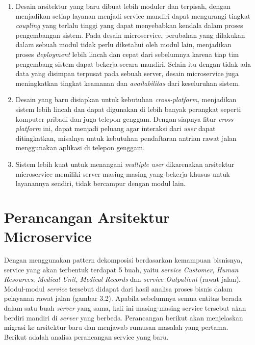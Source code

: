 \begin{enumerate}[leftmargin=*]
	\item Desain arsitektur yang baru dibuat lebih moduler dan terpisah, dengan menjadikan setiap layanan menjadi service mandiri dapat mengurangi tingkat \textit{coupling} yang terlalu tinggi yang dapat menyebabkan kendala dalam proses pengembangan sistem. Pada desain microservice, perubahan yang dilakukan dalam sebuah modul tidak perlu diketahui oleh modul lain, menjadikan proses \textit{deployment} lebih lincah dan cepat dari sebelumnya karena tiap tim pengembang sistem dapat bekerja secara mandiri. Selain itu dengan tidak ada data yang disimpan terpusat pada sebuah server, desain microservice juga meningkatkan tingkat keamanan dan \textit{availabilitas} dari keseluruhan sistem.
	\item Desain yang baru disiapkan untuk kebutuhan \textit{cross-platform}, menjadikan sistem lebih lincah dan dapat digunakan di lebih banyak perangkat seperti komputer pribadi dan juga telepon genggam. Dengan siapnya fitur \textit{cross-platform} ini, dapat menjadi peluang agar interaksi dari \textit{user} dapat ditingkatkan, misalnya untuk kebutuhan pendaftaran antrian rawat jalan menggunakan aplikasi di telepon genggam.
	\item Sistem lebih kuat untuk menangani \textit{multiple user} dikarenakan arsitektur microservice memiliki server masing-masing yang bekerja khusus untuk layanannya sendiri, tidak bercampur dengan modul lain.
\end{enumerate}

\section{Perancangan Arsitektur Microservice}
Dengan menggunakan pattern dekomposisi berdasarkan kemampuan bisnisnya, service yang akan terbentuk terdapat 5 buah, yaitu \textit{service Customer}, \textit{Human Resources}, \textit{Medical Unit}, \textit{Medical Records} dan \textit{service Outpatient} (rawat jalan). Modul-modul \textit{service} tersebut didapat dari hasil analisa proses bisnis dalam pelayanan rawat jalan (gambar 3.2). Apabila sebelumnya semua entitas berada dalam satu buah \textit{server} yang sama, kali ini masing-masing service tersebut akan berdiri mandiri di \textit{server} yang berbeda. Perancangan berikut akan menjelaskan migrasi ke arsitektur baru dan menjawab rumusan masalah yang pertama. Berikut adalah analisa perancangan service yang baru.
